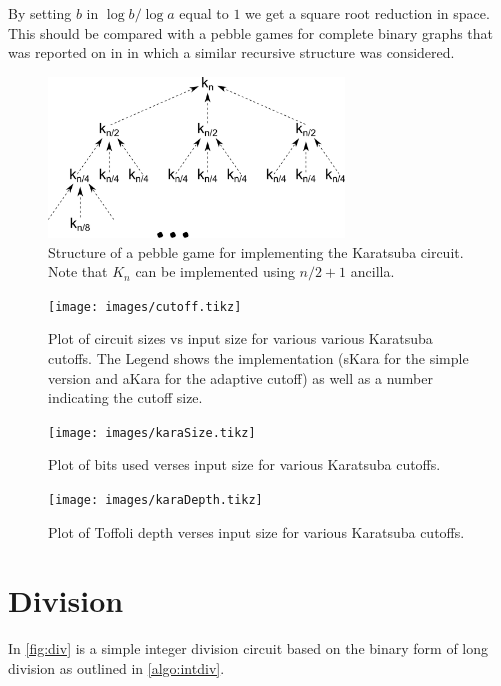 By setting $b$ in $\log b / \log a$ equal to $1$ we get a square root reduction
in space. This should be compared with a pebble games for complete binary
graphs that was reported on in \cite{peb16} in which a similar recursive
structure was considered.



      \begin{figure}[p]
        \capstart
        \centering
        \includegraphics[width=0.7\textwidth]{images/kara-mdd}
        \caption{Structure of a pebble game for implementing the Karatsuba circuit. Note that $K_n$ can be implemented using $n/2+1$ ancilla.}
        \label{fig:kara-mdd}
      \end{figure}

     \begin{figure}[p]
        \capstart
        \texttt{[image: images/cutoff.tikz]}
        \caption{Plot of circuit sizes vs input size for various various Karatsuba cutoffs.
                 The Legend shows the implementation (sKara for the simple version and aKara for the adaptive cutoff) as well as a number indicating the cutoff size. }
        \label{fig:cutoff}
      \end{figure}

      \begin{figure}[p]
        \capstart
        \texttt{[image: images/karaSize.tikz]}
        \caption{Plot of bits used verses input size for various Karatsuba cutoffs.}
        \label{fig:size}
      \end{figure}
      \begin{figure}[p]
        \capstart
        \texttt{[image: images/karaDepth.tikz]}
        \caption{Plot of Toffoli depth verses input size for various Karatsuba cutoffs.}
        \label{fig:depth}
      \end{figure}

\section{Division}
    In \cref{fig:div} is a simple integer division circuit based on the binary
    form of long division as outlined in \cref{algo:intdiv}.

